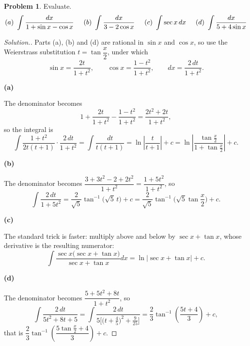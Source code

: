 \documentclass[11pt,a4paper]{article}
\theoremstyle{definition}
\newtheorem{problemx}{Problem}[subsection]
\newenvironment{problem}{\begin{problemx}}{\end{problemx}}
\newenvironment{solution}
  {\renewcommand{\qedsymbol}{}\begin{proof}[\textit{Solution}.]}
  {\end{proof}}
\newcommand{\subhead}[1]{%
  \par\medskip\noindent\textbf{#1}\par\nobreak\smallskip}
\begin{document}
\begin{problem}
Evaluate.
$$(a)\ \int\frac{dx}{1+\sin x-\cos x}\hspace{0.5cm}
(b)\ \int\frac{dx}{3-2\cos x}\hspace{0.5cm}
(c)\ \int\sec x\,dx\hspace{0.5cm}
(d)\ \int\frac{dx}{5+4\sin x}$$
\end{problem}
\begin{solution}
Parts (a), (b) and (d) are rational in $\sin x$ and $\cos x$, so use the
Weierstrass substitution $t = \tan\dfrac x2$, under which
$$\sin x = \frac{2t}{1+t^2},\qquad \cos x = \frac{1-t^2}{1+t^2},
\qquad dx = \frac{2\,dt}{1+t^2}.$$

\subhead{(a)} The denominator becomes
$$1 + \frac{2t}{1+t^2} - \frac{1-t^2}{1+t^2} = \frac{2t^2+2t}{1+t^2},$$
so the integral is
$$\int\frac{1+t^2}{2t(t+1)}\cdot\frac{2\,dt}{1+t^2}
= \int\frac{dt}{t(t+1)} = \ln\left|\frac{t}{t+1}\right| + c
= \ln\left|\frac{\tan\frac x2}{1+\tan\frac x2}\right| + c .$$

\subhead{(b)} The denominator becomes
$\dfrac{3+3t^2-2+2t^2}{1+t^2} = \dfrac{1+5t^2}{1+t^2}$, so
$$\int\frac{2\,dt}{1+5t^2} = \frac{2}{\sqrt5}\tan^{-1}\big(\sqrt5\,t\big) + c
= \frac{2}{\sqrt5}\tan^{-1}\!\Big(\sqrt5\tan\frac x2\Big) + c .$$

\subhead{(c)} The standard trick is faster: multiply above and below by
$\sec x + \tan x$, whose derivative is the resulting numerator:
$$\int\frac{\sec x\big(\sec x+\tan x\big)}{\sec x+\tan x}dx
= \ln\left|\sec x + \tan x\right| + c .$$

\subhead{(d)} The denominator becomes
$\dfrac{5+5t^2+8t}{1+t^2}$, so
$$\int\frac{2\,dt}{5t^2+8t+5}
= \int\frac{2\,dt}{5\Big[\big(t+\frac45\big)^2 + \frac{9}{25}\Big]}
= \frac{2}{3}\tan^{-1}\!\left(\frac{5t+4}{3}\right) + c ,$$
that is
$\dfrac23\tan^{-1}\!\left(\dfrac{5\tan\frac x2 + 4}{3}\right) + c$.
\end{solution}
\end{document}

